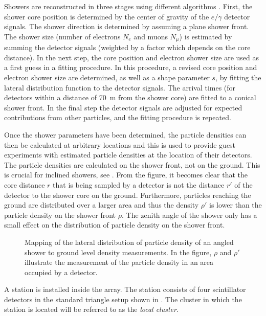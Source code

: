 Showers are reconstructed in three stages using different algorithms
\cite{Antoni:2000mg}.  First, the shower core position is determined by the
center of gravity of the $e/\gamma$ detector signals.  The shower direction is
determined by assuming a plane shower front.  The shower size (number of
electrons $N_e$ and muons $N_\mu$) is estimated by summing the detector signals
(weighted by a factor which depends on the core distance).  In the next step,
the core position and electron shower size are used as a first guess in a
fitting procedure.  In this procedure, a revised core position and electron
shower size are determined, as well as a shape parameter $s$, by fitting the
lateral distribution function to the detector signals.  The arrival times
(for detectors within a distance of \SI{70}{\meter} from the shower core) are
fitted to a conical shower front.  In the final step the detector signals are adjusted for expected
contributions from other particles, and the fitting procedure is repeated.

Once the shower parameters have been determined, the particle densities can then
be calculated at arbitrary locations and this is used to provide guest
experiments with estimated particle densities at the location of their
detectors. The particle densities are calculated on the shower front, not on the
ground. This is crucial for inclined showers, see .
From the figure, it becomes clear that the core distance $r$ that is being
sampled by a detector is not the distance $r'$ of the detector to the shower
core on the ground.  Furthermore, particles reaching the ground are distributed
over a larger area and thus the density $\rho'$ is lower than the particle
density on the shower front $\rho$. The zenith angle of the shower only has a
small effect on the distribution of particle density on the shower front.

\begin{figure}
\centering

\caption{Mapping of the lateral distribution of particle density of an angled
shower to ground level density measurements.  In the figure, $\rho$ and
$\rho'$ illustrate the measurement of the particle density in an area
occupied by a detector.}
\label{fig:inclined-ldf}
\end{figure}

A \hisparc station is installed inside the \kascade array.  The station
consists of four scintillator detectors in the standard triangle setup shown in
. The \kascade cluster in which the \hisparc station
is located will be referred to as the \emph{local cluster}.

